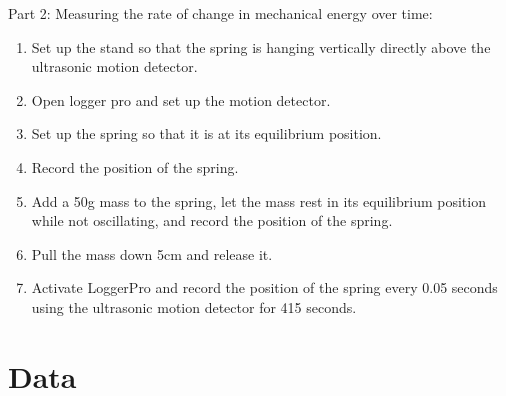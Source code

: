 \documentclass[titlepage]{article}
\begin{document}
        \noindent Part 2: Measuring the rate of change in mechanical energy over time:
        \begin{enumerate}
            \item Set up the stand so that the spring is hanging vertically directly above the ultrasonic motion detector.
            \item Open logger pro and set up the motion detector.
            \item Set up the spring so that it is at its equilibrium position.
            \item Record the position of the spring.
            \item Add a 50g mass to the spring, let the mass rest in its equilibrium position while not oscillating, and record the position of the spring.
            \item Pull the mass down 5cm and release it.
            \item Activate LoggerPro and record the position of the spring every 0.05 seconds using the ultrasonic motion detector for 415 seconds.
        \end{enumerate}
    
    
    \section{Data}
        
\end{document}
